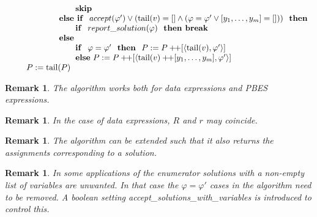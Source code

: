 \documentclass{article}
\newtheorem{remark}[theorem]{Remark}
\newcommand{\concat}{\ensuremath{+\!\!+}}
\begin{document}
\[\begin{tabular}{l}
\qquad \qquad \qquad \qquad \textbf{skip } \\
\qquad \qquad \qquad \textbf{else if } $accept(\varphi')
\vee (\mathrm{tail}(v) = [] \wedge (\varphi = \varphi' \vee [y_1,\ldots ,y_m] = [])) 
$ \textbf{ then} \\
\qquad \qquad \qquad \qquad \textbf{if } $report\_solution(\varphi)$ \textbf{ then break} \\
\qquad \qquad \qquad \textbf{else} \\
\qquad \qquad \qquad \qquad \textbf{if } $\varphi = \varphi'$ \textbf{ then }
$P:=P\concat\lbrack \left\langle \mathrm{tail}(v),\varphi'\right\rangle ]$ \\
\qquad \qquad \qquad \qquad \textbf{else}
$P:=P\concat\lbrack \left\langle \mathrm{tail}(v) \concat [y_{1},\ldots ,y_{m}],\varphi'\right\rangle ]$ \\
\qquad $P:=\mathrm{tail}(P)$
\end{tabular}
\]

\begin{remark}
The algorithm works both for data expressions and PBES expressions.
\end{remark}

\begin{remark}
In the case of data expressions, $R$ and $r$ may coincide.
\end{remark}

\begin{remark}
The algorithm can be extended such that it also returns the assignments
corresponding to a solution.
\end{remark}

\begin{remark}
In some applications of the enumerator solutions with a non-empty list of variables are unwanted. In that case the $\varphi = \varphi'$ cases in the algorithm need to be removed. A boolean setting accept\_solutions\_with\_variables is introduced to control this.
\end{remark}
\end{document}

